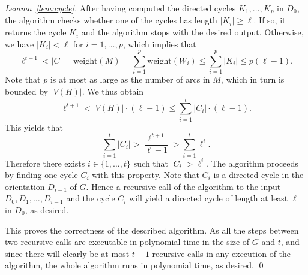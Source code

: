 \documentclass[runningheads]{llncs}
\begin{document}
\begin{proof}[Lemma~\ref{lem:cycle}]
After having computed the directed cycles $K_1,\ldots,K_p$ in $D_0$, the algorithm checks whether one of the cycles has length $|K_i|\ge \ell$.
If so, it returns the cycle $K_i$ and the algorithm stops with the desired output. Otherwise, we have $|K_i|<\ell$ for $i=1,\ldots,p$, which implies that
$$\ell^{t+1}<|C|=\text{weight}(M)=\sum_{i=1}^{p}{\text{weight}(W_i)} \le \sum_{i=1}^{p}{|K_i|} \le p(\ell -1).$$
Note that $p$ is at most as large as the number of arcs in $M$, which in turn is bounded by $|V(H)|$. We thus obtain
$$\ell^{t+1} < |V(H)| \cdot (\ell -1) \le \sum_{i=1}^{t} |C_i|\cdot (\ell -1).$$
This yields that
$$\sum_{i=1}^{t}{|C_i|} > \frac{\ell^{t+1}}{\ell -1}>\sum_{i=1}^{t}{\ell^i}.$$
Therefore there exists $i \in \{1,\ldots,t\}$ such that $|C_i|>\ell^i$. The algorithm proceeds by finding one cycle $C_i$ with this property. Note that $C_i$ is a directed cycle in the orientation $D_{i-1}$ of $G$. Hence a recursive call of the algorithm to the input $D_0,D_1,\ldots,D_{i-1}$ and the cycle $C_i$ will yield a directed cycle of length at least $\ell$ in $D_0$, as desired. 

This proves the correctness of the described algorithm. As all the steps between two recursive calls are executable in polynomial time in the size of $G$ and $t$, and since there will clearly be at most $t-1$ recursive calls in any execution of the algorithm, the whole algorithm runs in polynomial time, as desired. 
\qed\end{proof}
\end{document}
